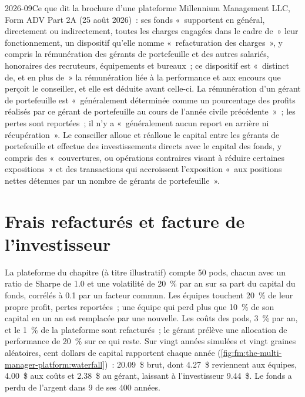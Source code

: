 \begin{dated}{2026-09}{Ce que dit la brochure d'une plateforme}\label{dat:fm:the-multi-manager-platform:adv}
Millennium Management LLC, Form ADV Part 2A (25 août 2026)~: ses fonds «~supportent en général, directement ou indirectement, toutes les charges engagées
dans le cadre de~» leur fonctionnement, un dispositif qu'elle nomme «~refacturation des charges~», y compris la rémunération des gérants de portefeuille et des autres
salariés, honoraires des recruteurs, équipements et bureaux~; ce dispositif est «~distinct de, et en plus de~» la rémunération liée à la performance et aux encours que perçoit le
conseiller, et elle est déduite avant celle-ci. La rémunération d'un gérant de portefeuille est «~généralement déterminée comme un pourcentage des profits réalisés par
ce gérant de portefeuille au cours de l'année civile précédente~»~; les pertes sont reportées~; il n'y a «~généralement aucun report en arrière ni récupération~». Le
conseiller alloue et réalloue le capital entre les gérants de portefeuille et effectue des investissements directs avec le capital des fonds, y compris des «~couvertures, ou
opérations contraires visant à réduire certaines expositions~» et des transactions qui accroissent l'exposition «~aux positions nettes détenues par un nombre
de gérants de portefeuille~».
\end{dated}

\section{Frais refacturés et facture de l'investisseur}

La plateforme du chapitre (à titre illustratif) compte 50 pods, chacun avec un ratio de Sharpe de 1.0 et une volatilité de 20~\% par an sur sa part du
capital du fonds, corrélés à 0.1 par un facteur commun. Les équipes touchent 20~\% de leur propre profit, pertes reportées~; une équipe qui perd plus
que 10~\% de son capital en un an est remplacée par une nouvelle. Les coûts des pods, 3~\% par an, et le 1~\% de la plateforme sont refacturés~; le gérant prélève
une allocation de performance de 20~\% sur ce qui reste. Sur vingt années simulées et vingt graines aléatoires, cent dollars de capital rapportent chaque année
(\cref{fig:fm:the-multi-manager-platform:waterfall})~: 20.09~\$ brut, dont 4.27~\$ reviennent aux équipes, 4.00~\$ aux coûts et 2.38~\$ au gérant,
laissant à l'investisseur 9.44~\$. Le fonds a perdu de l'argent dans 9 de ses 400 années.

